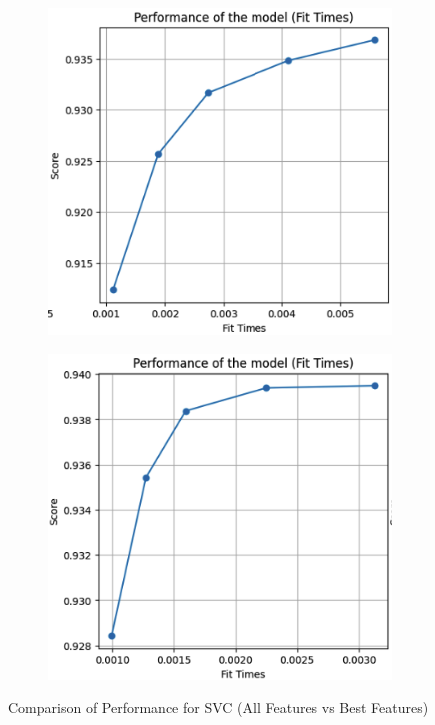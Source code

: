 \documentclass[conference]{IEEEtran}
\begin{document}
\begin{figure}[H]
    \centering
    \begin{subfigure}[b]{0.45\linewidth}
        \centering
        \includegraphics[width=\linewidth]{images/PerfomanceSVCAllFeatures.png}
        \label{fig:performance-all}
    \end{subfigure}
    \hfill
    \begin{subfigure}[b]{0.45\linewidth}
        \centering
        \includegraphics[width=\linewidth]{images/PerfomanceSVCBestFeatures.png}
        \label{fig:performance-best}
    \end{subfigure}
    \caption{Comparison of Performance for SVC (All Features vs Best Features)}
    \label{fig:performance-comparison}
\end{figure}
\end{document}
